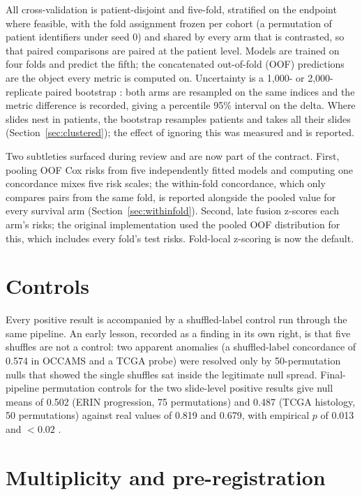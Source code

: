 All cross-validation is patient-disjoint and five-fold, stratified on the endpoint where feasible, with the fold assignment frozen per cohort (a permutation of patient identifiers under seed 0) and shared by every arm that is contrasted, so that paired comparisons are paired at the patient level. Models are trained on four folds and predict the fifth; the concatenated out-of-fold (OOF) predictions are the object every metric is computed on. Uncertainty is a 1,000- or 2,000-replicate paired bootstrap \citep{efron1993}: both arms are resampled on the same indices and the metric difference is recorded, giving a percentile 95\% interval on the delta. Where slides nest in patients, the bootstrap resamples patients and takes all their slides (Section~\ref{sec:clustered}); the effect of ignoring this was measured and is reported.

\label{sec:withinfold}Two subtleties surfaced during review and are now part of the contract. First, pooling OOF Cox risks from five independently fitted models and computing one concordance mixes five risk scales; the within-fold concordance, which only compares pairs from the same fold, is reported alongside the pooled value for every survival arm (Section~\ref{sec:withinfold}). Second, late fusion z-scores each arm's risks; the original implementation used the pooled OOF distribution for this, which includes every fold's test risks. Fold-local z-scoring is now the default.

\section{Controls}
\label{sec:controls}

Every positive result is accompanied by a shuffled-label control run through the same pipeline. An early lesson, recorded as a finding in its own right, is that five shuffles are not a control: two apparent anomalies (a shuffled-label concordance of 0.574 in OCCAMS and a TCGA probe) were resolved only by 50-permutation nulls that showed the single shuffles sat inside the legitimate null spread. Final-pipeline permutation controls for the two slide-level positive results give null means of 0.502 (ERIN progression, 75 permutations) and 0.487 (TCGA histology, 50 permutations) against real values of 0.819 and 0.679, with empirical $p$ of 0.013 and $<0.02$ .

\section{Multiplicity and pre-registration}
\label{sec:prereg}

